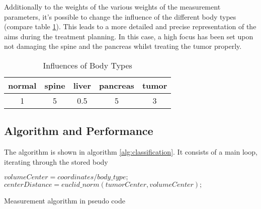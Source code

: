 Additionally to the weights of the various weights of the measurement parameters, it's possible to change the influence of the different body types (compare table \ref{tbl:classification_type_weights}). This leads to a more detailed and precise representation of the aims during the treatment planning. In this case, a high focus has been set upon not damaging the spine and the pancreas whilst treating the tumor properly. 

\begin{table}
\centering
\caption{Influences of Body Types}
\begin{tabular}[htbp]{c | c | c | c | c}
\textbf{normal} & \textbf{spine} & \textbf{liver} & \textbf{pancreas} & \textbf{tumor} \\ \hline
1 & 5 & 0.5 & 5 & 3
\end{tabular}
\label{tbl:classification_type_weights}
\end{table}

\subsection{Algorithm and Performance}\label{classification:algorithm}
The algorithm is shown in algorithm \ref{alg:classification}. It consists of a main loop, iterating through the stored body

\begin{algorithm}[H]
\label{alg:classification}
$volumeCenter = coordinates / body\_type;$ \\
$centerDistance = euclid\_norm (tumorCenter, volumeCenter);$ \\
\caption{Measurement algorithm in pseudo code}
\end{algorithm}


